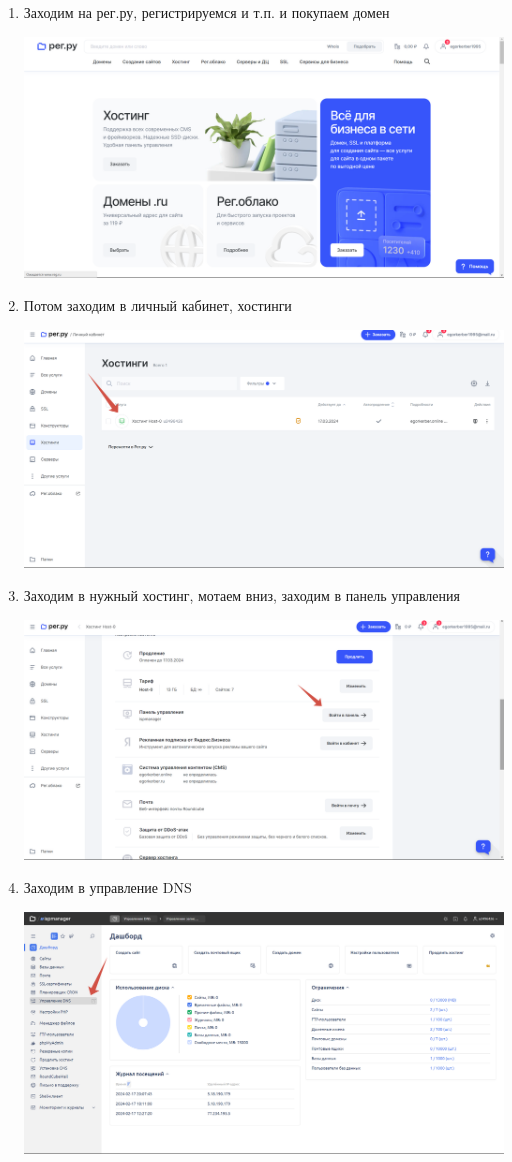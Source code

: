 \documentclass[14pt, a4paper]{extarticle}
\begin{document}
\begin{enumerate}
    \item Заходим на рег.ру, регистрируемся и т.п. и покупаем домен 
    
    \includegraphics*[width=0.8\linewidth]{img/2024-02-17-20-04-40.png}

    \item Потом заходим в личный кабинет, хостинги
    
    \includegraphics*[width=0.8\linewidth]{img/2024-02-17-20-06-31.png}

    \item Заходим в нужный хостинг, мотаем вниз, заходим в панель управления
    
    \includegraphics*[width=0.8\linewidth]{img/2024-02-17-20-07-22.png}

    \item Заходим в управление DNS 
    
    \includegraphics*[width=0.8\linewidth]{img/2024-02-17-20-08-22.png}


\end{enumerate}
\end{document}
